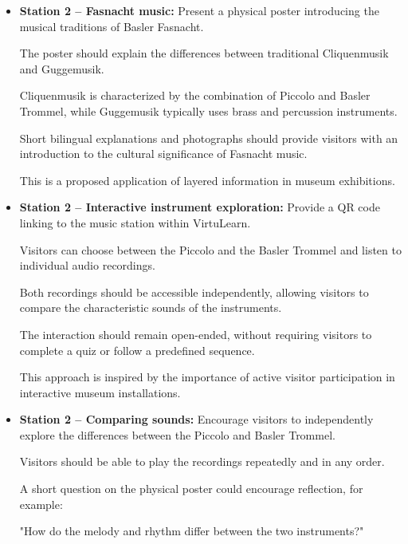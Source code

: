 \begin{itemize}
    Quiz game-based learning tasks were one of
    the design elements identified in the review,
    including four studies using mobile devices.
    \cite[pp.~9--10]{zhou_meta-analytic_2022}

    \item \textbf{Station 2 -- Fasnacht music:}
    Present a physical poster introducing the musical
    traditions of Basler Fasnacht.

    The poster should explain the differences between
    traditional Cliquenmusik and Guggemusik.

    Cliquenmusik is characterized by the combination
    of Piccolo and Basler Trommel, while Guggemusik
    typically uses brass and percussion instruments.

    Short bilingual explanations and photographs
    should provide visitors with an introduction
    to the cultural significance of Fasnacht music.

    This is a proposed application of layered
    information in museum exhibitions.
    \cite[p.~141]{hornecker_learning_2006}


    \item \textbf{Station 2 -- Interactive instrument exploration:}
    Provide a QR code linking to the music station
    within VirtuLearn.

    Visitors can choose between the Piccolo and
    the Basler Trommel and listen to individual
    audio recordings.

    Both recordings should be accessible independently,
    allowing visitors to compare the characteristic
    sounds of the instruments.

    The interaction should remain open-ended,
    without requiring visitors to complete a quiz
    or follow a predefined sequence.

    This approach is inspired by the importance
    of active visitor participation in interactive
    museum installations.
    \cite[p.~140]{hornecker_learning_2006}


    \item \textbf{Station 2 -- Comparing sounds:}
    Encourage visitors to independently explore
    the differences between the Piccolo and
    Basler Trommel.

    Visitors should be able to play the recordings
    repeatedly and in any order.

    A short question on the physical poster could
    encourage reflection, for example:

    "How do the melody and rhythm differ between
    the two instruments?"


\end{itemize}
